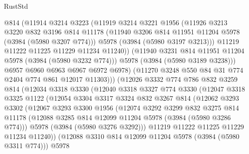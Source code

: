 \begin{lexlean}{RustStd}
\begin{coremodule}
                  @814
                  (@11914
                    @3214
                    @3223
                    (@11919
                      @3214
                      @3221
                      @1956
                      (@11926
                        @3213
                        @3220
                        @832
                        @3196
                        @814
                        @11178
                        (@11940 @3206 @814 @11951 @11204 @5978 (@3984 (@5980 @3207 @774)))
                        @5978
                        (@3984 (@5980 @3197 @3213)))
                      @11219
                      @11222
                      @11225
                      @11229
                      @11234
                      @11240))
                  (@11940 @3231 @814 @11951 @11204 @5978 (@3984 (@5980 @3232 @774)))
                  @5978
                  (@3984 (@5980 @3189 @3238)))
                @6957
                @6960
                @6963
                @6967
                @6972
                @6978)
              (@11270 @3248 @550 @84 @31 @774 @2404 @774 @861 @12017 @11303)))
          (@12026
            @3332
            @774
            @786
            @832
            @3259
            @814
            (@12034
              @3318
              @3330
              (@12040
                @3318
                @3327
                @774
                @3330
                (@12047
                  @3318
                  @3325
                  @1122
                  (@12054
                    @3304
                    @3317
                    @3324
                    @832
                    @3267
                    @814
                    (@12062
                      @3293
                      @3302
                      (@12067
                        @3293
                        @3300
                        @1956
                        (@12074
                          @3292
                          @3299
                          @832
                          @3275
                          @814
                          @11178
                          (@12088 @3285 @814 @12099 @11204 @5978 (@3984 (@5980 @3286 @774)))
                          @5978
                          (@3984 (@5980 @3276 @3292)))
                        @11219
                        @11222
                        @11225
                        @11229
                        @11234
                        @11240))
                    (@12088 @3310 @814 @12099 @11204 @5978 (@3984 (@5980 @3311 @774)))
                    @5978

\end{coremodule}
\end{lexlean}
